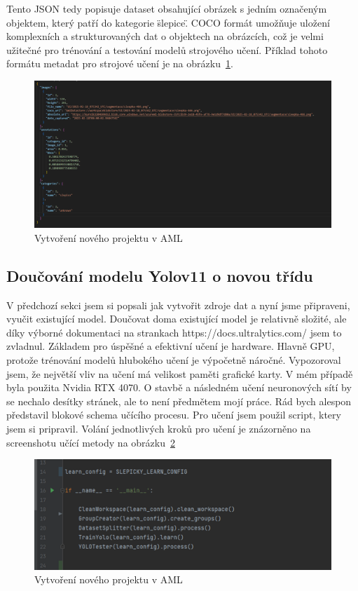 Tento JSON tedy popisuje dataset obsahující obrázek s jedním označeným objektem, který patří do kategorie \"slepice\".
COCO formát umožňuje uložení komplexních a strukturovaných dat o objektech na obrázcích, což je velmi užitečné pro trénování a testování modelů strojového učení.
Příklad tohoto formátu metadat pro strojové učení je na obrázku~\ref{fig:coco_format}.

\begin{figure}[h]
    \centering
    \includegraphics[width=\textwidth]{img/coco_format}
    \caption{Vytvoření nového projektu v AML}
    \label{fig:coco_format}
\end{figure}

\subsection{Doučování modelu Yolov11 o novou třídu}\label{subsec:doucovani-modelu-yolov11-o-novou-tridu}
V předchozí sekci jsem si popsali jak vytvořit zdroje dat a nyní jsme připraveni, vyučit existující model.
Doučovat doma existující model je relativně složité, ale díky výborné dokumentaci na strankach https://docs.ultralytics.com/ jsem to zvladnul.
Základem pro úspěšné a efektivní učení je hardware.
Hlavně GPU, protože trénování modelů hlubokého učení je výpočetně náročné.
Vypozoroval jsem, že největší vliv na učení má velikost paměti grafické karty.
V mém případě byla použita Nvidia RTX 4070.
O stavbě a následném učení neuronových sítí by se nechalo desítky stránek, ale to není předmětem mojí práce.
Rád bych alespon představil blokové schema učícího procesu.\newline
\newline
Pro učení jsem použil script, ktery jsem si pripravil.
Volání jednotlivých kroků pro učení je znázorněno na screenshotu učící metody na obrázku~\ref{fig:learn_script}

\begin{figure}[h]
    \centering
    \includegraphics[width=\textwidth]{img/learn_script}
    \caption{Vytvoření nového projektu v AML}
    \label{fig:learn_script}
\end{figure}

